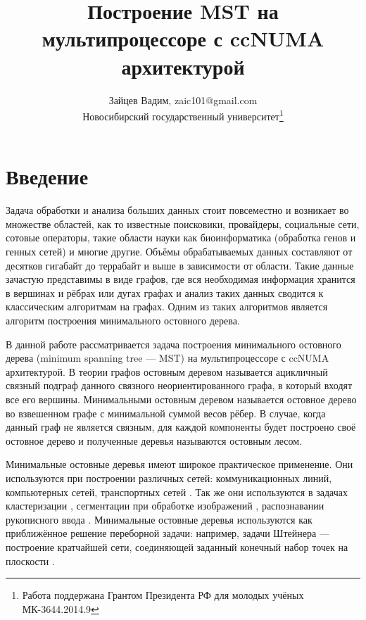 \documentclass[a4paper,10pt]{extarticle}
\date{}
\title{Построение MST на мультипроцессоре с ccNUMA архитектурой}
\author{Зайцев Вадим, zaic101@gmail.com \\ Новосибирский государственный университет\thanks{Работа поддержана Грантом Президента РФ для молодых учёных МК-3644.2014.9}}
\begin{document}

\tableofcontents



\newpage
\section{Введение}
Задача обработки и анализа больших данных стоит повсеместно и возникает во множестве областей, как то известные поисковики, провайдеры, социальные сети, сотовые операторы, такие области науки как биоинформатика (обработка генов и генных сетей) и многие другие.
Объёмы обрабатываемых данных составляют от десятков гигабайт до террабайт и выше в зависимости от области.
Такие данные зачастую представимы в виде графов, где вся необходимая информация хранится в вершинах и рёбрах или дугах графах и анализ таких данных сводится к классическим алгоритмам на графах.
Одним из таких алгоритмов является алгоритм построения минимального остовного дерева.

В данной работе рассматривается задача построения минимального остовного дерева (minimum spanning tree --- MST) на мультипроцессоре с ccNUMA архитектурой.
В теории графов остовным деревом называется ацикличный связный подграф данного связного неориентированного  графа, в который входят все его вершины. Минимальными остовным деревом называется остовное дерево во взвешенном графе с минимальной суммой весов рёбер.
В случае, когда данный граф не является связным, для каждой компоненты будет построено своё остовное дерево и полученные деревья называются остовным лесом.

Минимальные остовные деревья имеют широкое практическое применение.
Они используются при построении различных сетей: коммуникационных линий, компьютерных сетей, транспортных сетей \cite{mst-usage-network}.
Так же они используются в задачах кластеризации \cite{mst-usage-cluster}, сегментации при обработке изображений \cite{mst-usage-image}, распознавании рукописного ввода \cite{mst-usage-handwrite}.
Минимальные остовные деревья  используются как приближённое решение переборной задачи: например, задачи Штейнера --- построение кратчайшей сети, соединяющей заданный конечный набор точек на плоскости \cite{shtree}.
\end{document}
